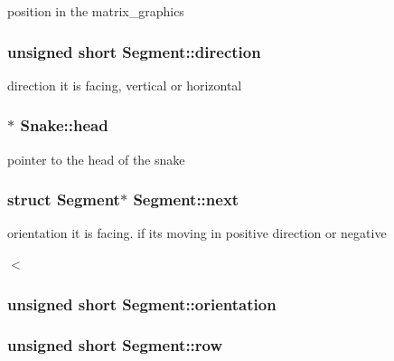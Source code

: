 position in the matrix\+\_\+graphics 

\subsubsection[{\texorpdfstring{direction}{direction}}]{\setlength{\rightskip}{0pt plus 5cm}unsigned short Segment\+::direction}\hypertarget{group__snake_gacf610091b7f59fb0f1f37c6df4e14c18}{}\label{group__snake_gacf610091b7f59fb0f1f37c6df4e14c18}


direction it is facing, vertical or horizontal 

\subsubsection[{\texorpdfstring{head}{head}}]{$\ast$ Snake\+::head}\hypertarget{group__snake_gaf63e50ac65f365d67ae3975a178cba8c}{}\label{group__snake_gaf63e50ac65f365d67ae3975a178cba8c}


pointer to the head of the snake 

\subsubsection[{\texorpdfstring{next}{next}}]{\setlength{\rightskip}{0pt plus 5cm}struct {\bf Segment}$\ast$ Segment\+::next}\hypertarget{group__snake_ga20fb1741f720a656ec35972c2305a2d9}{}\label{group__snake_ga20fb1741f720a656ec35972c2305a2d9}


orientation it is facing. if its moving in positive direction or negative 

$<$ 
\subsubsection[{\texorpdfstring{orientation}{orientation}}]{\setlength{\rightskip}{0pt plus 5cm}unsigned short Segment\+::orientation}\hypertarget{group__snake_gadd6c62d3fd2c3aab9175c07694fdc075}{}\label{group__snake_gadd6c62d3fd2c3aab9175c07694fdc075}
\subsubsection[{\texorpdfstring{row}{row}}]{\setlength{\rightskip}{0pt plus 5cm}unsigned short Segment\+::row}\hypertarget{group__snake_ga5c86edfec316ae4d5033a85525babed6}{}\label{group__snake_ga5c86edfec316ae4d5033a85525babed6}

